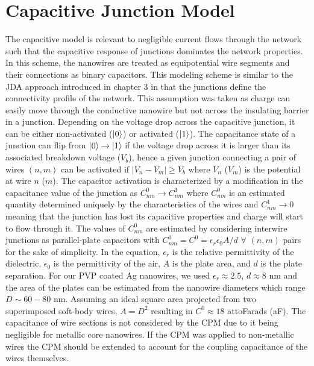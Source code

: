 \section{Capacitive Junction Model}
\label{Sec: cap_comp_model}
The capacitive model is relevant to negligible current flows through the network such that the capacitive response of junctions dominates the network properties. In this scheme, the nanowires are treated as equipotential wire segments and their connections as binary capacitors. This modeling scheme is similar to the JDA approach introduced in chapter 3 in that the junctions define the connectivity profile of the network. This assumption was taken as charge can easily move through the conductive nanowire but not across the insulating barrier in a junction. Depending on the voltage drop across the capacitive junction, it can be either non-activated ($|0\rangle$) or activated ($|1\rangle$). The capacitance state of a junction can flip from $|0\rangle\rightarrow |1\rangle$ if the voltage drop across it is larger than its associated breakdown voltage ($V_b$), hence a given junction connecting a pair of wires $(n,m)$ can be activated if $|V_\textit{n} - V_\textit{m}| \geq V_b$ where $V_\textit{n}$ ($V_\textit{m}$) is the potential at wire $n$ ($m$). The capacitor activation is characterized by a modification in the capacitance value of the junction as $C_{\textit{nm}}^0 \rightarrow C_{\textit{nm}}^1$ where $C_{\textit{nm}}^0$ is an estimated quantity determined uniquely by the characteristics of the wires and $C_{\textit{nm}}^1\rightarrow 0$ meaning that the junction has lost its capacitive properties and charge will start to flow through it. The values of $C_{\textit{nm}}^0$ are estimated by considering interwire junctions as parallel-plate capacitors with $C_{\textit{nm}}^0 = C^0 = \epsilon_r \epsilon_0 A/d$ $\forall$ $(n,m)$ pairs for the sake of simplicity. In the equation, $\epsilon_r$ is the relative permittivity of the dielectric, $\epsilon_0$ is the permittivity of the air, $A$ is the plate area, and $d$ is the plate separation. For our PVP coated Ag nanowires, we used $\epsilon_r\approx 2.5$, $d\approx 8$ nm and the area of the plates can be estimated from the nanowire diameters which range $D\sim 60-80$ nm. Assuming an ideal square area projected from two superimposed soft-body wires, $A=D^2$ resulting in $C^0 \approx 18$ attoFarads (aF). The capacitance of wire sections is not considered by the CPM due to it being negligible for metallic core nanowires. If the CPM was applied to non-metallic wires the CPM should be extended to account for the coupling capacitance of the wires themselves.

